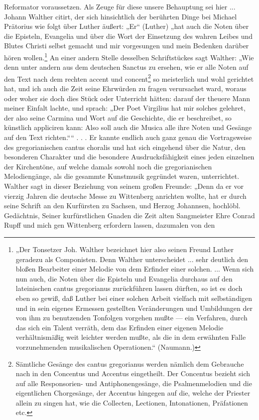 Reformator voraussetzen. Als Zeuge für diese unsere Behauptung sei hier ... Johann Walther citirt, der sich hinsichtlich der berührten Dinge bei Michael Prätorius wie folgt über Luther äußert: „Er“ (Luther) „hat auch die Noten über die Episteln, Evangelia und über die Wort der Einsetzung des wahren Leibes und Blutes Christi selbst gemacht und mir vorgesungen und mein Bedenken darüber hören wollen.\footnote{„Der Tonsetzer Joh. Walther bezeichnet hier also seinen Freund Luther geradezu als Componisten. Denn Walther unterscheidet ... sehr deutlich den bloßen Bearbeiter einer Melodie von dem Erfinder einer solchen. ... Wenn sich nun auch, die Noten über die Episteln und Evangelia durchaus auf den lateinischen cantus gregorianus zurückführen lassen dürften, so ist es doch eben so gewiß, daß Luther bei einer solchen Arbeit vielfach mit selbständigen und in sein eigenes Ermessen gestellten Veränderungen und Umbildungen der von ihm zu benutzenden Tonfolgen vorgehen mußte — ein Verfahren, durch das sich ein Talent verräth, dem das Erfinden einer eigenen Melodie verhältnismäßig weit leichter werden mußte, als die in dem erwähnten Falle vorzunehmenden musikalischen Operationen.“ (Naumann.)} An einer andern Stelle desselben Schriftstückes sagt Walther: „Wie denn unter andern aus dem deutschen Sanctus zu ersehen, wie er alle Noten auf den Text nach dem rechten accent und concent\footnote{Sämtliche Gesänge des cantus gregorianus werden nämlich dem Gebrauche nach in den Concentus und Accentus eingetheilt. Der Concentus bezieht sich auf alle Responsorien- und Antiphonengesänge, die Psalmenmelodien und die eigentlichen Chorgesänge, der Accentus hingegen auf die, welche der Priester allein zu singen hat, wie die Collecten, Lectionen, Intonationen, Präfationen etc.} so meisterlich und wohl gerichtet hat, und ich auch die Zeit seine Ehrwürden zu fragen verursachet ward, woraus oder woher sie doch dies Stück oder Unterricht hätten: darauf der theuere Mann meiner Einfalt lachte, und sprach: „Der Poet Virgilius hat mir solches gelehret, der also seine Carmina und Wort auf die Geschichte, die er beschreibet, so künstlich appliciren kann: Also soll auch die Musica alle ihre Noten und Gesänge auf den Text richten.““ . . . Er kannte endlich auch ganz genau die Vortragsweise des gregorianischen cantus choralis und hat sich eingehend über die Natur, den besonderen Charakter und die besondere Ausdrucksfähigkeit eines jeden einzelnen der Kirchentöne, auf welche damals sowohl noch die gregorianischen Melodiengänge, als die gesammte Kunstmusik gegründet waren, unterrichtet. Walther sagt in dieser Beziehung von seinem großen Freunde: „Denn da er vor vierzig Jahren die deutsche Messe zu Wittenberg anrichten wollte, hat er durch seine Schrift an den Kurfürsten zu Sachsen, und Herzog Johannsen, hochlöbl. Gedächtnis, Seiner kurfürstlichen Gnaden die Zeit alten Sangmeister Ehre Conrad Rupff und mich gen Wittenberg erfordern lassen, dazumalen von den
